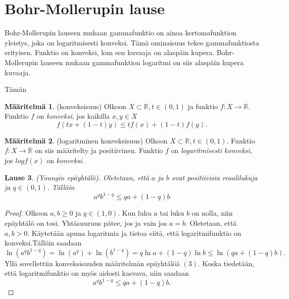 \documentclass[12pt]{article}
\theoremstyle{definition}
\newtheorem{maar}{Määritelmä}
\theoremstyle{plain}
\newtheorem{lause}[maar]{Lause}
\begin{document}
\newpage





\section{Bohr-Mollerupin lause}
\onehalfspacing
Bohr-Mollerupin lauseen mukaan gammafunktio on ainoa kertomafunktion yleistys, joka on logaritmisesti konveksi. Tämä ominaisuus tekee gammafunktiosta erityisen. Funktio on konveksi, kun sen kuvaaja on alaspäin kupera. Bohr-Mollerupin lauseen mukaan gammafunktion logaritmi on siis alaspäin kupera kuvaaja.
\newline

Tämän 

\begin{maar}
(konveksisuus)
Olkoon $X\subset\mathbb{R}, t \in (0, 1)$ ja funktio $f: X \rightarrow \mathbb{R}$. Funktio $f$ on \emph{konveksi}, jos kaikilla $x,y \in X$
\begin{equation}
    f(tx+(1-t)y) \le tf(x)+(1-t)f(y).
\end{equation}
\end{maar}


\begin{maar}
(logaritminen konveksisuus)
Olkoon $X\subset\mathbb{R}, t \in (0, 1)$. Funktio $f: X \rightarrow \mathbb{R}$ on siis määritelty ja positiivinen. Funktio $f$ on \emph{logaritmisesti konveksi}, jos $logf(x)$ on \emph{konveksi}.
\end{maar}

\begin{lause}
(Youngin epäyhtälö). Oletetaan, että $a$ ja $b$ ovat positiivisia reaalilukuja ja $q \in (0,1)$. Tällöin
\begin{equation}
    a^{q}b^{1-q} \le qa+(1-q)b
\end{equation}
\end{lause}
\begin{proof}
Olkoon $a,b \ge 0$ ja $q \in (1,0)$. Kun luku $a$ tai luku $b$ on nolla, niin epäyhtälö on tosi. Yhtäsuuruus pätee, jos ja vain jos $a=b$. Oletetaan, että $a,b > 0$. Käytetään apuna logaritmia ja tietoa siitä, että logaritmifunktio on konveksi.Tällöin saadaan
\begin{equation*}
    \ln(a^{q}b^{1-q}) = \ln(a^q) + \ln(b^{1-q}) = q \ln a+(1-q)\ln b \le \ln(qa+(1-q)b).
\end{equation*}
Yllä sovellettiin konveksisuuden määritelmän epäyhtälöä $(3)$. Koska tiedetään, että logaritmifunktio on myös aidosti kasvava, niin saadaan 
\begin{equation*}
    a^{q}b^{1-q}\le qa+(1-q)b.
\end{equation*}
\end{proof}
\end{document}
